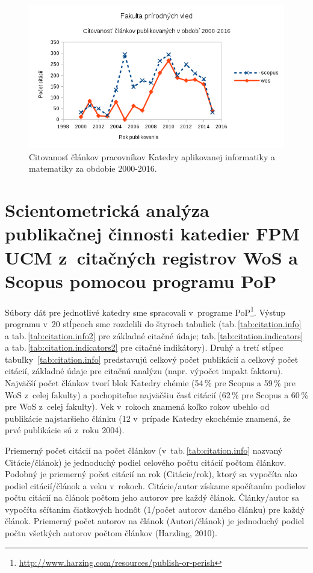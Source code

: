 \begin{figure}
  \centering
  \includegraphics[width=\textwidth]{obr/plot-inf-citations.png}
  \caption{Citovanosť článkov pracovníkov Katedry aplikovanej informatiky a
    matematiky za obdobie 2000-2016.}
  \label{fig:plot.inf.citations}
\end{figure}


\section{Scientometrická analýza publikačnej činnosti katedier FPM UCM z~citačných registrov WoS a Scopus pomocou programu PoP}

Súbory dát pre jednotlivé katedry sme spracovali v~programe
PoP\footnote{\url{http://www.harzing.com/resources/publish-or-perish}}.  Výstup
programu v~20 stĺpcoch sme rozdelili do štyroch tabuliek
(tab.\,\ref{tab:citation.info} a tab.\,\ref{tab:citation.info2} pre základné
citačné údaje; tab.\,\ref{tab:citation.indicators} a
tab.\,\ref{tab:citation.indicators2} pre citačné indikátory).  Druhý a tretí
stĺpec tabuľky~\ref{tab:citation.info} predstavujú celkový počet publikácií a
celkový počet citácií, základné údaje pre citačnú analýzu (napr. výpočet impakt
faktoru).  Najväčší počet článkov tvorí blok Katedry chémie (54\,\% pre Scopus a
59\,\% pre WoS z~celej fakulty) a pochopiteľne najväčšiu časť citácií (62\,\%
pre Scopus a 60\,\% pre WoS z~celej fakulty).  Vek v~rokoch znamená koľko rokov
ubehlo od publikácie najstaršieho článku (12 v~prípade Katedry ekochémie
znamená, že prvé publikácie sú z~roku 2004).

Priemerný počet citácií na počet článkov (v~tab.\,\ref{tab:citation.info}
nazvaný Citácie/článok) je jednoduchý podiel celového počtu citácií počtom
článkov.  Podobný je priemerný počet citácií na rok (Citácie/rok), ktorý sa
vypočíta ako podiel citácií/článok a veku v~rokoch.  Citácie/autor získame
spočítaním podielov počtu citácií na článok počtom jeho autorov pre každý
článok.  Články/autor sa vypočíta sčítaním čiatkových hodnôt (1/počet autorov
daného článku) pre každý článok.  Priemerný počet autorov na článok
(Autori/článok) je jednoduchý podiel počtu všetkých autorov počtom článkov
(Harzling, 2010).

